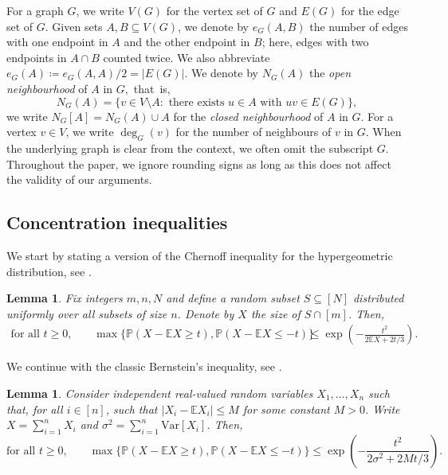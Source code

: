 \documentclass[reqno,a4paper]{amsart}
\newtheorem{lemma}[theorem]{Lemma}
\theoremstyle{definition}
\newcommand{\lyuc}[1]{{\color{blue}{ [~Lyuben:\ }\emph{#1}\textbf{~]}}}
\begin{document}
For a graph $G$, we write $V(G)$ for the vertex set of $G$ and $E(G)$ for the edge set of $G$. 
Given sets $A,B\subseteq V(G)$, we denote by $e_G(A,B)$ the number of edges with one endpoint in $A$ and the other endpoint in $B$; here, edges with two endpoints in $A\cap B$ counted twice. 
We also abbreviate $e_G(A)\coloneqq e_G(A,A)/2=|E(G)|$. We denote by $N_G(A)$ the \emph{open neighbourhood} of $A$ in $G$,~that~is,
\[
N_G(A)=\{v\in V\setminus A:\text{ there exists }u\in A\text{ with }uv\in E(G)\},
\]
we write $N_G[A]=N_G(A)\cup A$ for the \emph{closed neighbourhood} of $A$ in $G$. 
For a vertex $v\in V$, we write $\deg_G(v)$ for the number of neighbours of $v$ in $G$. %
When the underlying graph is clear from the context, we often omit the subscript $G$. 
Throughout the paper, we ignore rounding signs as long as
this does not affect the validity of our arguments.

\subsection{Concentration inequalities}

We start by stating a version of the Chernoff inequality for the hypergeometric distribution, see \cite[Theorem~2.10]{JLR00}.

\begin{lemma}\label{lem:chernoff_hyp}
Fix integers $m,n,N$ and define a random subset $S\subseteq [N]$ distributed uniformly over all subsets of size $n$.
Denote by $X$ the size of $S\cap [m]$.
Then,
\begin{align*}
\text{for all $t\ge 0$,}\qquad \max\{\mathbb{P}(X-\mathbb E X \ge t),\mathbb{P}(X - \mathbb E X \le -t)\} &\le \exp\left(-\frac{t^2}{2\mathbb E X + 2t/3}\right).
\end{align*}
\end{lemma}

We continue with the classic Bernstein's inequality, see \cite[Theorem 2.9.5]{Ver18}.

\begin{lemma}\label{lem:Bernstein}
Consider independent real-valued random variables $X_1, \dots, X_n$ such that, for all $i \in [n]$, such that $|X_i-\mathbb E X_i| \le M$ for some constant $M>0$. 
Write $X = \sum_{i=1}^n X_i$ and $\sigma^2 = \sum_{i=1}^n \mathrm{Var}[X_i]$. Then,
\begin{equation}
    \text{for all $t\ge 0$,}\qquad \max\{\mathbb{P}\left( X-\mathbb E X \ge t \right),\mathbb{P}\left( X-\mathbb E X \le -t \right)\} \le \exp \left( -\frac{t^2}{2\sigma^2 + 2Mt/3} \right).
\end{equation}
\end{lemma}
\end{document}

